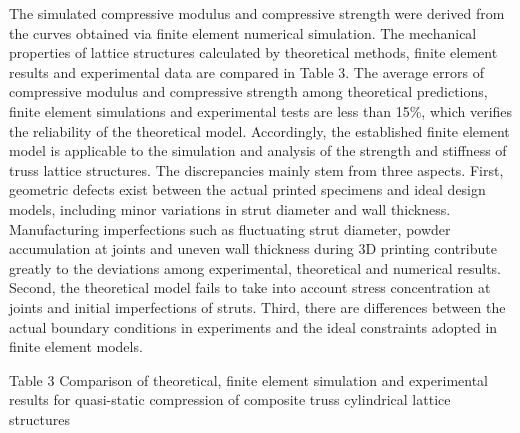 \documentclass{article} %
\begin{document}
The simulated compressive modulus and compressive strength were derived from the curves obtained via finite element numerical simulation. The mechanical properties of lattice structures calculated by theoretical methods, finite element results and experimental data are compared in Table 3. The average errors of compressive modulus and compressive strength among theoretical predictions, finite element simulations and experimental tests are less than 15\%, which verifies the reliability of the theoretical model. Accordingly, the established finite element model is applicable to the simulation and analysis of the strength and stiffness of truss lattice structures. The discrepancies mainly stem from three aspects. First, geometric defects exist between the actual printed specimens and ideal design models, including minor variations in strut diameter and wall thickness. Manufacturing imperfections such as fluctuating strut diameter, powder accumulation at joints and uneven wall thickness during 3D printing contribute greatly to the deviations among experimental, theoretical and numerical results. Second, the theoretical model fails to take into account stress concentration at joints and initial imperfections of struts. Third, there are differences between the actual boundary conditions in experiments and the ideal constraints adopted in finite element models.

Table 3  Comparison of theoretical, finite element simulation and experimental results for quasi-static compression of composite truss cylindrical lattice structures
\end{document}

